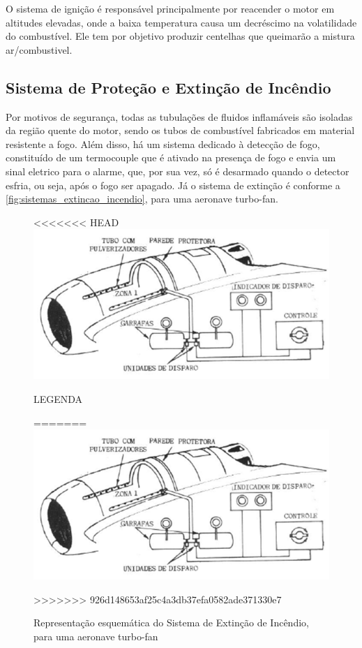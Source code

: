 O sistema de ignição é responsável principalmente por reacender o motor em altitudes elevadas, onde a baixa temperatura causa um decréscimo na volatilidade do combustível.
Ele tem por objetivo produzir centelhas que queimarão a mistura ar/combustivel.

\subsection{Sistema de Proteção e Extinção de Incêndio}

Por motivos de segurança, todas as tubulações de fluidos inflamáveis são isoladas da região quente do motor, sendo os tubos de combustível fabricados em material resistente a fogo.
Além disso, há um sistema dedicado à detecção de fogo, constituído de um termocouple que é ativado na presença de fogo e envia um sinal eletrico para o alarme, que, por sua vez, só é desarmado quando o detector esfria, ou seja, após o fogo ser apagado.
Já o sistema de extinção é conforme a \autoref{fig:sistemas_extincao_incendio}, para uma aeronave turbo-fan.

\begin{figure}
<<<<<<< HEAD
\centering
\includegraphics{images/parte3/sistemas_extincao_incendio.png}
\caption{LEGENDA}
=======
\includegraphics[width=\textwidth]{images/parte3/sistemas_extincao_incendio.png}
\caption{Representação esquemática do Sistema de Extinção de Incêndio, para uma aeronave turbo-fan}
>>>>>>> 926d148653af25c4a3db37efa0582ade371330e7
\label{fig:sistemas_extincao_incendio}
\end{figure}


